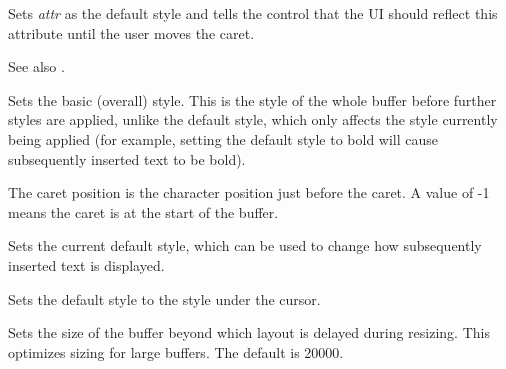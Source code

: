 
Sets {\it attr} as the default style and tells the control that the UI should reflect
this attribute until the user moves the caret.

See also .

\label{wxrichtextctrlsetbasicstyle}



Sets the basic (overall) style. This is the style of the whole
buffer before further styles are applied, unlike the default style, which
only affects the style currently being applied (for example, setting the default
style to bold will cause subsequently inserted text to be bold).

\label{wxrichtextctrlsetcaretposition}


The caret position is the character position just before the caret.
A value of -1 means the caret is at the start of the buffer.

\label{wxrichtextctrlsetdefaultstyle}


Sets the current default style, which can be used to change how subsequently inserted
text is displayed.

\label{wxrichtextctrlsetdefaultstyletocursorstyle}


Sets the default style to the style under the cursor.

\label{wxrichtextctrlsetdelayedlayoutthreshold}


Sets the size of the buffer beyond which layout is delayed during resizing.
This optimizes sizing for large buffers. The default is 20000.

